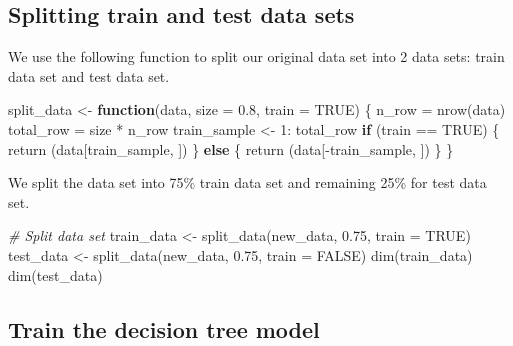 \documentclass[
]{article}
\newenvironment{Shaded}{\begin{snugshade}}{\end{snugshade}}
\newcommand{\AttributeTok}[1]{\textcolor[rgb]{0.77,0.63,0.00}{#1}}
\newcommand{\CommentTok}[1]{\textcolor[rgb]{0.56,0.35,0.01}{\textit{#1}}}
\newcommand{\ConstantTok}[1]{\textcolor[rgb]{0.00,0.00,0.00}{#1}}
\newcommand{\ControlFlowTok}[1]{\textcolor[rgb]{0.13,0.29,0.53}{\textbf{#1}}}
\newcommand{\DecValTok}[1]{\textcolor[rgb]{0.00,0.00,0.81}{#1}}
\newcommand{\FloatTok}[1]{\textcolor[rgb]{0.00,0.00,0.81}{#1}}
\newcommand{\FunctionTok}[1]{\textcolor[rgb]{0.00,0.00,0.00}{#1}}
\newcommand{\NormalTok}[1]{#1}
\newcommand{\OtherTok}[1]{\textcolor[rgb]{0.56,0.35,0.01}{#1}}
\newcommand{\SpecialCharTok}[1]{\textcolor[rgb]{0.00,0.00,0.00}{#1}}
\begin{document}
\hypertarget{splitting-train-and-test-data-sets}{%
\subsection{Splitting train and test data
sets}\label{splitting-train-and-test-data-sets}}

We use the following function to split our original data set into 2 data
sets: train data set and test data set.

\begin{Shaded}
\begin{Highlighting}[]
\NormalTok{split\_data }\OtherTok{\textless{}{-}} \ControlFlowTok{function}\NormalTok{(data, }\AttributeTok{size =} \FloatTok{0.8}\NormalTok{, }\AttributeTok{train =} \ConstantTok{TRUE}\NormalTok{) \{}
\NormalTok{  n\_row }\OtherTok{=} \FunctionTok{nrow}\NormalTok{(data)}
\NormalTok{  total\_row }\OtherTok{=}\NormalTok{ size }\SpecialCharTok{*}\NormalTok{ n\_row}
\NormalTok{  train\_sample }\OtherTok{\textless{}{-}} \DecValTok{1}\SpecialCharTok{:}\NormalTok{ total\_row}
  \ControlFlowTok{if}\NormalTok{ (train }\SpecialCharTok{==} \ConstantTok{TRUE}\NormalTok{) \{}
    \FunctionTok{return}\NormalTok{ (data[train\_sample, ])}
\NormalTok{  \} }\ControlFlowTok{else}\NormalTok{ \{}
    \FunctionTok{return}\NormalTok{ (data[}\SpecialCharTok{{-}}\NormalTok{train\_sample, ])}
\NormalTok{  \}}
\NormalTok{\}}
\end{Highlighting}
\end{Shaded}

We split the data set into 75\% train data set and remaining 25\% for
test data set.

\begin{Shaded}
\begin{Highlighting}[]
\CommentTok{\# Split data set}
\NormalTok{train\_data }\OtherTok{\textless{}{-}} \FunctionTok{split\_data}\NormalTok{(new\_data, }\FloatTok{0.75}\NormalTok{, }\AttributeTok{train =} \ConstantTok{TRUE}\NormalTok{)}
\NormalTok{test\_data }\OtherTok{\textless{}{-}} \FunctionTok{split\_data}\NormalTok{(new\_data, }\FloatTok{0.75}\NormalTok{, }\AttributeTok{train =} \ConstantTok{FALSE}\NormalTok{)}
\FunctionTok{dim}\NormalTok{(train\_data)}
\FunctionTok{dim}\NormalTok{(test\_data)}
\end{Highlighting}
\end{Shaded}

\hypertarget{train-the-decision-tree-model}{%
\subsection{Train the decision tree
model}\label{train-the-decision-tree-model}}
\end{document}
